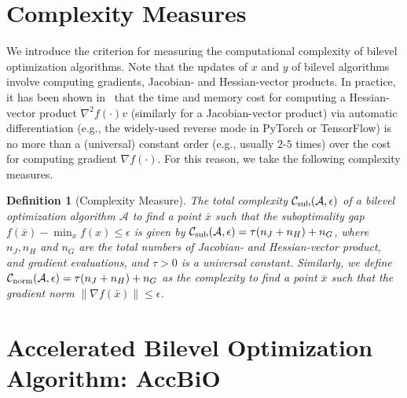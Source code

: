 \documentclass{osudissert96}
\newtheorem{definition}{Definition}
\begin{document}
\section{Complexity Measures}
We introduce the criterion for measuring the computational complexity of bilevel optimization algorithms. Note that the updates of $x$ and $y$ of bilevel algorithms involve computing gradients, Jacobian- and Hessian-vector products. In practice, it has been shown in~\cite{griewank1993some,rajeswaran2019meta} that the time and memory cost for computing a  Hessian-vector product $\nabla^2f(\cdot) v $ (similarly for a Jacobian-vector product) via automatic differentiation (e.g., the widely-used reverse mode in PyTorch or TensorFlow)  is no more than a (universal) constant order (e.g., usually $2$-$5$ times) over the cost for computing gradient $\nabla f(\cdot)$. For this reason,  we take the following complexity measures.    
\begin{definition}[Complexity Measure]\label{complexity_measyre}
The total complexity $\mathcal{C}_{\text{\normalfont sub}}(\mathcal{A},\epsilon)$ of a bilevel optimization algorithm $\mathcal{A}$ to find a point $\bar x$ such that the suboptimality gap $f(\bar x)-\min_xf(x)\leq \epsilon$  is given by 
$\mathcal{C}_{\text{\normalfont sub}}(\mathcal{A},\epsilon) = \tau (n_J+n_H) + n_G$, 
where $n_J,n_ H$ and $n_G$ are the total numbers of Jacobian- and Hessian-vector product, and gradient evaluations, and $\tau>0$ is a universal constant.  Similarly, we define $\mathcal{C}_{\text{\normalfont norm}}(\mathcal{A},\epsilon)= \tau (n_J+n_H) + n_G$ as the complexity to find a point $\bar x$ such that the gradient norm $\|\nabla f(\bar x)\|\leq \epsilon$.
\end{definition}
 

\section{Accelerated Bilevel Optimization Algorithm: AccBiO} \label{upper_withoutB}

\end{document}
